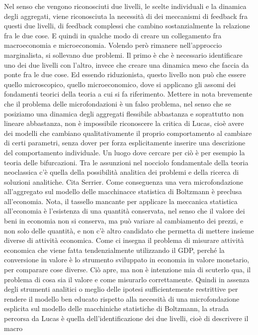 \documentclass[a4paper, headings=standardclasses]{scrartcl}
\begin{document}
Nel senso che vengono riconosciuti due livelli, le scelte individuali e la dinamica degli aggregati,
viene riconosciuta la necessità di dei meccanismi di feedback fra questi due livelli,
di feedback complessi che cambino sostanzialmente la relazione fra le due cose.
E quindi in qualche modo di creare un collegamento fra macroeconomia e microeconomia.
Volendo però rimanere nell'approccio marginalista, si sollevano due problemi. Il primo è che è
necessario identificare uno dei due livelli con l'altro, invece che creare una dinamica meso che
faccia da ponte fra le due cose. Ed essendo riduzionista, questo livello non può che
essere quello microscopico, quello microeconomico, dove si applicano gli assomi dei fondamenti
teorici della teoria a cui si fa riferimento.
Mettere in nota brevemente che il problema delle microfondazioni è un falso problema,
nel senso che se posiziamo una dinamica degli aggregati flessibile abbastanza e soprattutto
non lineare abbastanza, non è impossibile riconoscere la critica di Lucas, cioè avere
dei modelli che cambiano qualitativamente il proprio comportamento al cambiare di certi
parametri, senza dover per forza esplicitamente inserire una descrizione del comportamento
individuale. Un luogo dove cercare per ciò è per esempio la teoria delle bifurcazioni.
Tra le assunzioni nel nocciolo fondamentale della teoria neoclassica c'è quella della
possibilità analitica dei problemi e della ricerca di soluzioni analitiche. Cita Serrier.
Come conseguenza una vera microfondazione all'aggregato sul modello delle macchinacce
statistica di Boltzmann è preclusa all'economia. Nota, il tassello mancante per applicare la
meccanica statistica all'economia è l'esistenza di una quantità conservata, nel senso che
il valore dei beni in economia non si conserva, ma può variare al cambiamento dei prezzi,
e non solo delle quantità, e non c'è altro candidato che permetta di mettere insieme
diverse di attività economica. Come ci insegna il problema di misurare attività economica
che viene fatta tendenzialmente utilizzando il GDP, perché la conversione in valore è
lo strumento sviluppato in economia in valore monetario, per comparare cose diverse. Ciò
apre, ma non è intenzione mia di scuterlo qua, il problema di cosa sia il valore e come
misurarlo correttamente. Quindi in assenza degli strumenti analitici o meglio delle ipotesi
sufficientemente restrittive per rendere il modello ben educato rispetto alla necessità
di una microfondazione esplicita sul modello delle macchiniche statistiche di Boltzmann,
la strada percorsa da Lucas è quella dell'identificazione dei due livelli, cioè di descrivere il macro
\end{document}
